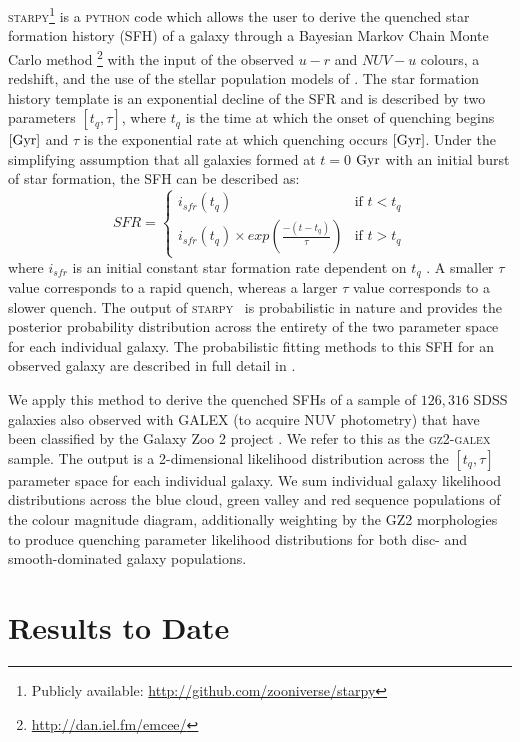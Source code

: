 \documentclass[useAMS,usenatbib]{mn2e}
\def\starpy {\textsc{starpy}}
\begin{document}
\textsc{starpy}\footnote{Publicly available: \url{http://github.com/zooniverse/starpy}} is a \textsc{python} code which allows the user to derive the quenched star formation history (SFH) of a galaxy through a Bayesian Markov Chain Monte Carlo method \citep{Dan}\footnote{\url{http://dan.iel.fm/emcee/}} with the input of the observed $u-r$ and $NUV-u$ colours, a redshift, and the use of the stellar population models of \cite{BC03}. The star formation history template is an exponential decline of the SFR and is described by two parameters $[t_q, \tau]$, where $t_q$ is the time at which the onset of quenching begins $\rm{[Gyr]}$ and $\tau$ is the exponential rate at which quenching occurs $\rm{[Gyr]}$. Under the simplifying assumption that all galaxies formed at $t=0$ $\rm{ Gyr}$ with an initial burst of star formation, the SFH can be described as: 
\begin{equation}\label{sfh}
SFR =
\begin{cases}
i_{sfr}(t_q) & \text{if } t < t_q \\
i_{sfr}(t_q) \times exp{\left( \frac{-(t-t_{q})}{\tau}\right)} & \text{if } t > t_q 
\end{cases}
\end{equation}
where $i_{sfr}$ is an initial constant star formation rate dependent on $t_q$ \citep{Sch2014, Sme2015}.  A smaller $\tau$ value corresponds to a rapid quench, whereas a larger $\tau$ value corresponds to a slower quench. The output of \starpy  ~ is probabilistic in nature and provides the posterior probability distribution across the entirety of the two parameter space for each individual galaxy. The probabilistic fitting methods to this SFH for an observed galaxy are described in full detail in \cite{Sme2015}. 

We apply this method to derive the quenched SFHs of a sample of $126, 316$ SDSS galaxies also observed with GALEX (to acquire NUV photometry) that have been classified by the Galaxy Zoo 2 project \cite{GZ2}. We refer to this as the \textsc{gz2-galex} sample. The output is a 2-dimensional likelihood distribution across the $[t_q, \tau]$ parameter space for each individual galaxy. We sum individual galaxy likelihood distributions across the blue cloud, green valley and red sequence populations of the colour magnitude diagram, additionally weighting by the GZ2 morphologies to produce quenching parameter likelihood distributions for both disc- and smooth-dominated galaxy populations. 

\section{Results to Date}
\end{document}
